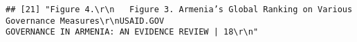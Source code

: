 \documentclass[
]{article}
\begin{document}
\begin{verbatim}
## [21] "Figure 4.\r\n   Figure 3. Armenia’s Global Ranking on Various Governance Measures\r\nUSAID.GOV                                            GOVERNANCE IN ARMENIA: AN EVIDENCE REVIEW | 18\r\n"                                                                                                                                                                                                                                                                                                                                                                                                                                                                                                                                                                                                                                                                                                                                                                                                                                                                                                                                                                                                                                                                                                                                                                                                                                                                                                                                                                                                                                                                                                                                                                                                                                                                                                                                                                                                                                                                                                                                                                                                                                                                                                                                                                                                                                                                                                                                                                                                                                                                                                                                                                                                                                                                                                                                                                                                                                                                                                                                                                                                                                                                                                                                                                                                                                                 
\end{verbatim}
\end{document}
